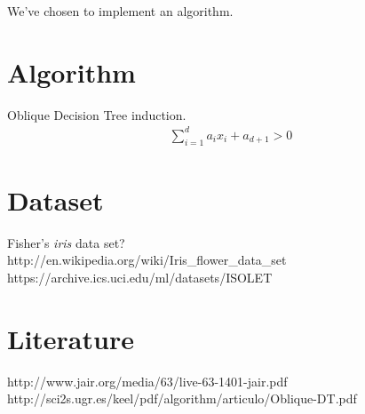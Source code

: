 \documentclass{article}
\begin{document}
    We've chosen to implement an algorithm.

    \section*{Algorithm}
    Oblique Decision Tree induction.
    \begin{align*}
        \sum_{i=1}^{d}a_i x_i + a_{d+1} > 0 
    \end{align*}

    \section*{Dataset}
    Fisher's \emph{iris} data set? \\
    http://en.wikipedia.org/wiki/Iris\_flower\_data\_set \\
    https://archive.ics.uci.edu/ml/datasets/ISOLET \\

    \section*{Literature}
    http://www.jair.org/media/63/live-63-1401-jair.pdf \\
    http://sci2s.ugr.es/keel/pdf/algorithm/articulo/Oblique-DT.pdf \\
\end{document}
